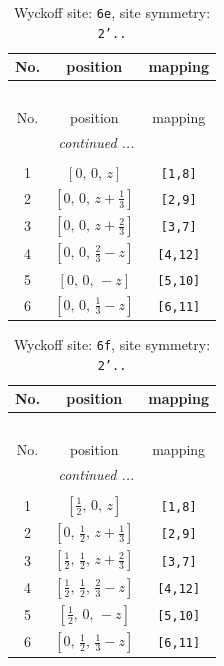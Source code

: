 \documentclass[fleqn,8pt]{jsarticle}
\begin{document}
\begin{longtable}{ccc}
\caption{Wyckoff site: {\tt 6e}, site symmetry: {\tt 2'..}}
 \\
 \hline \hline
No. & position & mapping \\ \hline \endfirsthead

\multicolumn{2}{l}{\tablename\ \thetable{}} \\
 \hline \hline
No. & position & mapping \\ \hline \endhead

 \hline \hline
\multicolumn{2}{r}{\footnotesize\it continued ...} \\ \endfoot

 \hline \hline
\multicolumn{2}{r}{} \\ \endlastfoot

1 & $\left[ 0,\, 0,\, z \right]$ & {\tt [1,8]} \\ \hline
2 & $\left[ 0,\, 0,\, z + \frac{1}{3} \right]$ & {\tt [2,9]} \\ \hline
3 & $\left[ 0,\, 0,\, z + \frac{2}{3} \right]$ & {\tt [3,7]} \\ \hline
4 & $\left[ 0,\, 0,\, \frac{2}{3} - z \right]$ & {\tt [4,12]} \\ \hline
5 & $\left[ 0,\, 0,\, - z \right]$ & {\tt [5,10]} \\ \hline
6 & $\left[ 0,\, 0,\, \frac{1}{3} - z \right]$ & {\tt [6,11]} \\
\end{longtable}
\renewcommand{\arraystretch}{1.2}
\begin{longtable}{ccc}
\caption{Wyckoff site: {\tt 6f}, site symmetry: {\tt 2'..}}
 \\
 \hline \hline
No. & position & mapping \\ \hline \endfirsthead

\multicolumn{2}{l}{\tablename\ \thetable{}} \\
 \hline \hline
No. & position & mapping \\ \hline \endhead

 \hline \hline
\multicolumn{2}{r}{\footnotesize\it continued ...} \\ \endfoot

 \hline \hline
\multicolumn{2}{r}{} \\ \endlastfoot

1 & $\left[ \frac{1}{2},\, 0,\, z \right]$ & {\tt [1,8]} \\ \hline
2 & $\left[ 0,\, \frac{1}{2},\, z + \frac{1}{3} \right]$ & {\tt [2,9]} \\ \hline
3 & $\left[ \frac{1}{2},\, \frac{1}{2},\, z + \frac{2}{3} \right]$ & {\tt [3,7]} \\ \hline
4 & $\left[ \frac{1}{2},\, \frac{1}{2},\, \frac{2}{3} - z \right]$ & {\tt [4,12]} \\ \hline
5 & $\left[ \frac{1}{2},\, 0,\, - z \right]$ & {\tt [5,10]} \\ \hline
6 & $\left[ 0,\, \frac{1}{2},\, \frac{1}{3} - z \right]$ & {\tt [6,11]} \\
\end{longtable}
\end{document}
